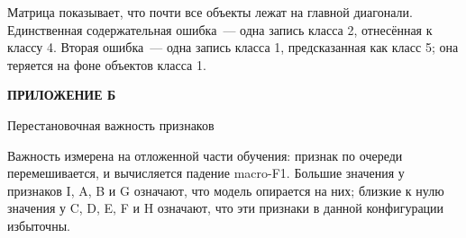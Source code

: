 \documentclass[14pt,a4paper]{extarticle}
\begin{document}


Матрица показывает, что почти все объекты лежат на главной диагонали.
Единственная содержательная ошибка~--- одна запись класса 2, отнесённая
к классу 4. Вторая ошибка~--- одна запись класса 1, предсказанная как
класс 5; она теряется на фоне \SupportClassOne{} объектов класса 1.

\clearpage
\setcounter{table}{0}
\renewcommand{\thetable}{Б.\arabic{table}}

\begin{center}\bfseries ПРИЛОЖЕНИЕ Б\end{center}
\begin{center}Перестановочная важность признаков\end{center}



Важность измерена на отложенной части обучения: признак по очереди
перемешивается, и вычисляется падение macro-F1. Большие значения
у признаков I, A, B и G означают, что модель опирается на них;
близкие к нулю значения у C, D, E, F и H означают, что эти признаки
в данной конфигурации избыточны.
\end{document}
